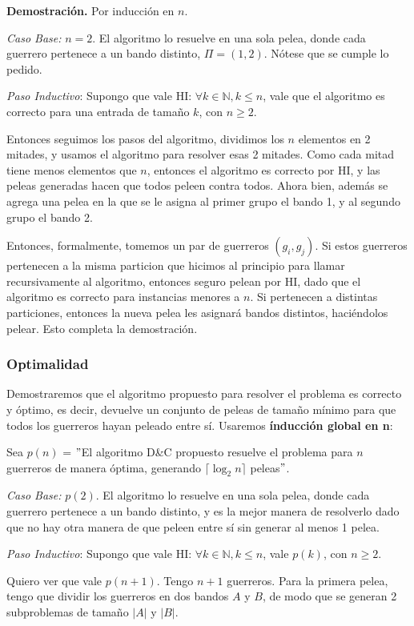 \textbf{Demostración.}  Por inducción en $n$.

\textit{Caso Base:} $n = 2$. El algoritmo lo resuelve en una sola pelea, donde cada guerrero pertenece a un bando distinto, $\Pi = {(1,2)}$. Nótese que se cumple lo pedido.

\textit{Paso Inductivo}: Supongo que vale HI: $\forall k \in \mathbb{N}, k \leq n$, vale que el algoritmo es correcto para una entrada de tamaño $k$, con $n \geq 2$.

Entonces seguimos los pasos del algoritmo, dividimos los $n$ elementos en 2 mitades, y usamos el algoritmo para resolver esas 2 mitades. Como cada mitad tiene menos elementos que $n$, entonces el algoritmo es correcto por HI, y las peleas generadas hacen que todos peleen contra todos. Ahora bien, además se agrega una pelea en la que se le asigna al primer grupo el bando 1, y al segundo grupo el bando 2.

Entonces, formalmente, tomemos un par de guerreros $(g_i, g_j)$. Si estos guerreros pertenecen a la misma particion que hicimos al principio para llamar recursivamente al algoritmo, entonces seguro pelean por HI, dado que el algoritmo es correcto para instancias menores a $n$. Si pertenecen a distintas particiones, entonces la nueva pelea les asignará bandos distintos, haci\'endolos pelear. Esto completa la demostración.

\subsubsection{Optimalidad}

Demostraremos que el algoritmo propuesto para resolver el problema es correcto y óptimo, es decir, devuelve un conjunto de peleas de tamaño mínimo para que todos los guerreros hayan peleado entre sí. Usaremos \textbf{índucción global en n}:

Sea $p(n)$ = $"$El algoritmo D\&C propuesto resuelve el problema para $n$ guerreros de manera óptima, generando $\lceil \log _2 n \rceil$ peleas$"$. 

\textit{Caso Base:} $p(2)$. El algoritmo lo resuelve en una sola pelea, donde cada guerrero pertenece a un bando distinto, y es la mejor manera de resolverlo dado que no hay otra manera de que peleen entre sí sin generar al menos 1 pelea.

\textit{Paso Inductivo}: Supongo que vale HI: $\forall k \in \mathbb{N}, k \leq n$, vale $p(k)$, con $n \geq 2$.

Quiero ver que vale $p(n+1)$.
Tengo $n+1$ guerreros. Para la primera pelea, tengo que dividir los guerreros en dos bandos $A$ y $B$, de modo que se generan 2 subproblemas de tamaño $|A|$ y $|B|$.

